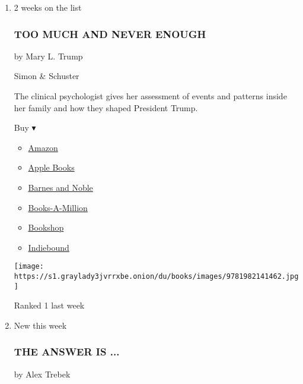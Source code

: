 \begin{enumerate}
\def\labelenumi{\arabic{enumi}.}
\item
  2 weeks on the list

  \hypertarget{too-much-and-never-enough}{%
  \subsubsection{TOO MUCH AND NEVER
  ENOUGH}\label{too-much-and-never-enough}}

  by Mary L. Trump

  Simon \& Schuster

  The clinical psychologist gives her assessment of events and patterns
  inside her family and how they shaped President Trump.

  Buy ▾

  \begin{itemize}
  \tightlist
  \item
    \href{https://www.amazon.com/dp/1982141468?tag=NYTBSREV-20\&tag=NYTBS-20}{Amazon}
  \item
    \href{https://du-gae-books-dot-nyt-du-prd.appspot.com/buy?title=TOO+MUCH+AND+NEVER+ENOUGH\&author=Mary+L+Trump}{Apple
    Books}
  \item
    \href{https://www.anrdoezrs.net/click-7990613-11819508?url=https\%3A\%2F\%2Fwww.barnesandnoble.com\%2Fw\%2F\%3Fean\%3D9781982141462}{Barnes
    and Noble}
  \item
    \href{https://www.anrdoezrs.net/click-7990613-35140?url=https\%3A\%2F\%2Fwww.booksamillion.com\%2Fp\%2FTOO\%2BMUCH\%2BAND\%2BNEVER\%2BENOUGH\%2FMary\%2BL\%2BTrump\%2F9781982141462}{Books-A-Million}
  \item
    \href{https://bookshop.org/a/3546/9781982141462}{Bookshop}
  \item
    \href{https://www.indiebound.org/book/9781982141462?aff=NYT}{Indiebound}
  \end{itemize}

  \texttt{[image: https://s1.graylady3jvrrxbe.onion/du/books/images/9781982141462.jpg]}

  Ranked 1 last week
\item
  New this week

  \hypertarget{the-answer-is-}{%
  \subsubsection{THE ANSWER IS ...}\label{the-answer-is-}}

  by Alex Trebek


\end{enumerate}
